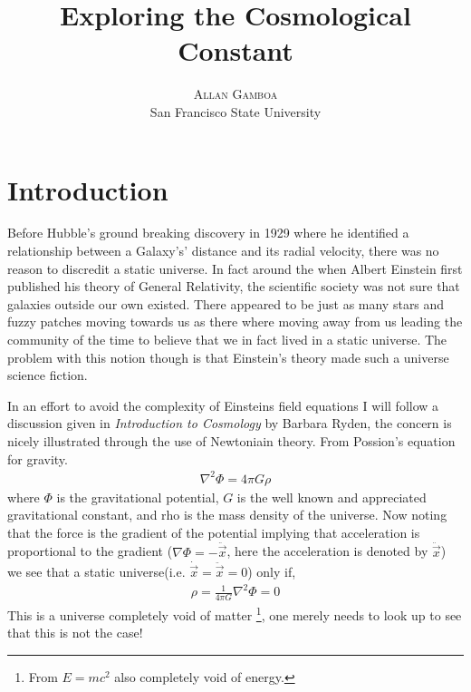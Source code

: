 \documentclass[twoside]{article}
\title{\vspace{-15mm}\fontsize{24pt}{10pt}\selectfont\textbf{Exploring the Cosmological Constant}} %
\author{
\large
\textsc{Allan Gamboa}\\ %
\normalsize San Francisco State University
\vspace{-5mm}
}
\date{}
\begin{document}
\maketitle %

\thispagestyle{fancy} %


\section{Introduction}
Before Hubble's ground breaking discovery in 1929 where he identified a relationship between a Galaxy's' distance and its radial velocity, there was no reason to discredit a static universe. In fact around the when Albert Einstein first published his theory of General Relativity, the scientific society was not sure that galaxies outside our own existed. There appeared to be just as many stars and fuzzy patches moving towards us as there where moving away from us leading the community of the time to believe that we in fact lived in a static universe. The problem with this notion though is that Einstein's theory made such a universe science fiction.\par
In an effort to avoid the complexity of Einsteins field equations I will follow a discussion given in \emph{Introduction to Cosmology} by Barbara Ryden,  the concern is nicely illustrated through the use of Newtoniain theory. From Possion's equation for gravity.
\begin{align}
\nabla^{2}\Phi = 4\pi G\rho\label{eq:poisson}
\end{align} 
where $\Phi$ is the gravitational potential, $G$ is the well known and appreciated gravitational constant, and rho is the mass density of the universe. Now noting that the force is the gradient of the potential implying that acceleration is proportional to the gradient ($\nabla\Phi = -\ddot{\vec{x}}$, here the acceleration is denoted by $\ddot{\vec{x}}$) we see that a static universe(i.e. $\dot{\vec{x}}=\ddot{\vec{x}} = 0$) only if,
\begin{align}
\rho = \frac{1}{4\pi G}\nabla^{2}\Phi = 0
\end{align}
This is a universe completely void of matter
\footnote{From $E=mc^{2}$ also completely void of energy.},
one merely needs to look up to see that this is not the case!\par
\end{document}
